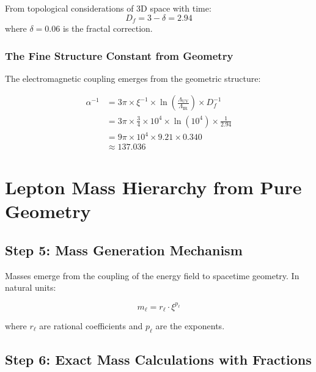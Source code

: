 \documentclass[12pt,a4paper]{article}
\newcommand{\xipar}{\xi}  %
\begin{document}
	From topological considerations of 3D space with time:
	\begin{equation}
		D_f = 3 - \delta = 2.94
	\end{equation}
	where $\delta = 0.06$ is the fractal correction.
	
	\subsubsection{The Fine Structure Constant from Geometry}
	
	The electromagnetic coupling emerges from the geometric structure:
	
	\begin{keyresult}
		\begin{align}
			\alpha^{-1} &= 3\pi \times \xipar^{-1} \times \ln\left(\frac{\Lambda_{\text{UV}}}{\Lambda_{\text{IR}}}\right) \times D_f^{-1} \\
			&= 3\pi \times \frac{3}{4} \times 10^{4} \times \ln(10^{4}) \times \frac{1}{2.94} \\
			&= 9\pi \times 10^{4} \times 9.21 \times 0.340 \\
			&\approx 137.036
		\end{align}
	\end{keyresult}
	

	\section{Lepton Mass Hierarchy from Pure Geometry}
	
	\subsection{Step 5: Mass Generation Mechanism}
	
	Masses emerge from the coupling of the energy field to spacetime geometry. In natural units:
	
	\begin{equation}
		m_{\ell} = r_{\ell} \cdot \xipar^{p_{\ell}}
	\end{equation}
	
	where $r_{\ell}$ are rational coefficients and $p_{\ell}$ are the exponents.
	
	\subsection{Step 6: Exact Mass Calculations with Fractions}
	
\end{document}
